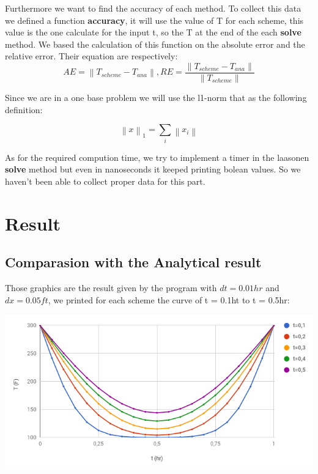 \documentclass [10 pt, a4 paper]{article}
\begin{document}
Furthermore we want to find the accuracy of each method. To collect this data we defined a function
\textbf{accuracy}, it will use the value of T for each scheme, this value is the one calculate for
the input t, so the T at the end of the each \textbf{solve} method. 
We based the calculation of this function on the absolute error and the relative error.
Their equation are respectively:
\begin{equation}
    AE = \left \| T_{scheme} - T_{ana} \right \|, RE = \frac{\left \| T_{scheme} - T_{ana} \right \|}{\left \| T_{scheme} \right \|}
\end{equation}

Since we are in a one base problem we will use the l1-norm that as the following definition:

\begin{equation}
    \left \| x \right \|_{1} = \sum_{i} \left \| x_{i} \right \|
\end{equation}

As for the required compution time, we try to implement a timer in the laasonen \textbf{solve} method
but even in nanoseconds it keeped printing bolean values. So we haven't been able to collect proper data
for this part.
\newpage
\section{Result}
\subsection{Comparasion with the Analytical result}

Those graphics are the result given by the program with $dt = 0.01hr$ and $dx = 0.05ft$, 
we printed for each scheme the curve of t = 0.1ht to t = 0.5hr: 

\begin{center} 
    \includegraphics[scale=0.5]{Chart/analytical.PNG}
\end{center}
\end{document}
